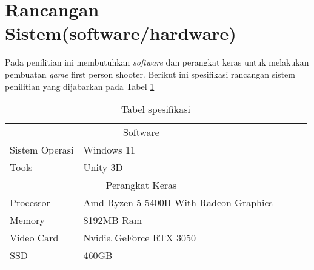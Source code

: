 \section{Rancangan Sistem(software/hardware)}
\noindent

    Pada penilitian ini membutuhkan \textit{software} dan perangkat keras untuk melakukan pembuatan \textit{game} first person shooter. Berikut ini spesifikasi rancangan sistem penilitian yang dijabarkan pada Tabel \ref{tb:tabel-spesifikasi}
    \newpage
    \begin{table}[h]
        \centering
        \caption{Tabel spesifikasi}
        \label{tb:tabel-spesifikasi}
        \begin{tabular}{|ll|lll}
        \cline{1-2}
        \multicolumn{2}{|c|}{Software}                                                &  &  &  \\ \cline{1-2}
        \multicolumn{1}{|l|}{Sistem Operasi} & Windows 11                             &  &  &  \\ \cline{1-2}
        \multicolumn{1}{|l|}{Tools}          & Unity 3D                                 &  &  &  \\ \cline{1-2}
        \multicolumn{2}{|c|}{Perangkat Keras}                                         &  &  &  \\ \cline{1-2}
        \multicolumn{1}{|l|}{Processor}      & Amd Ryzen 5 5400H With Radeon Graphics &  &  &  \\ \cline{1-2}
        \multicolumn{1}{|l|}{Memory}         & 8192MB Ram                             &  &  &  \\ \cline{1-2}
        \multicolumn{1}{|l|}{Video Card}     & Nvidia GeForce RTX 3050                &  &  &  \\ \cline{1-2}
        \multicolumn{1}{|l|}{SSD}            & 460GB                                  &  &  &  \\ \cline{1-2}
        \end{tabular}
        \end{table}


